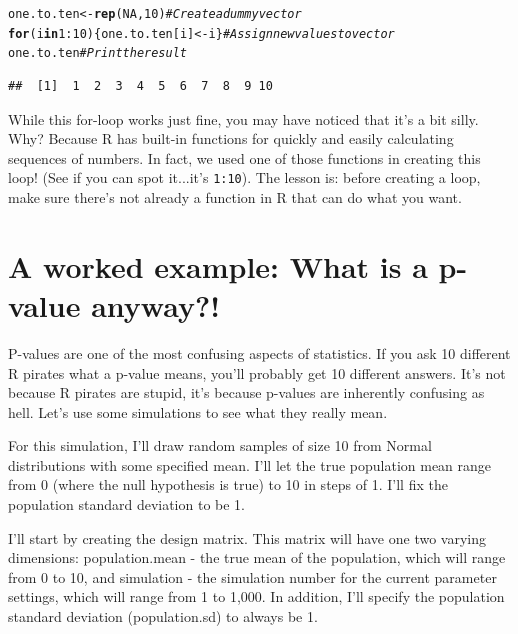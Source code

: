 \documentclass{tufte-book}\usepackage[]{graphicx}\usepackage[]{color}
\makeatletter
\newcommand{\hlnum}[1]{\textcolor[rgb]{0.686,0.059,0.569}{#1}}%
\newcommand{\hlcom}[1]{\textcolor[rgb]{0.678,0.584,0.686}{\textit{#1}}}%
\newcommand{\hlopt}[1]{\textcolor[rgb]{0,0,0}{#1}}%
\newcommand{\hlstd}[1]{\textcolor[rgb]{0.345,0.345,0.345}{#1}}%
\newcommand{\hlkwa}[1]{\textcolor[rgb]{0.161,0.373,0.58}{\textbf{#1}}}%
\newcommand{\hlkwb}[1]{\textcolor[rgb]{0.69,0.353,0.396}{#1}}%
\newcommand{\hlkwd}[1]{\textcolor[rgb]{0.737,0.353,0.396}{\textbf{#1}}}%
\newenvironment{kframe}{%
 \def\at@end@of@kframe{}%
 \ifinner\ifhmode%
  \def\at@end@of@kframe{\end{minipage}}%
  \begin{minipage}{\columnwidth}%
 \fi\fi%
 \def\FrameCommand##1{\hskip\@totalleftmargin \hskip-\fboxsep
 \colorbox{shadecolor}{##1}\hskip-\fboxsep
     \hskip-\linewidth \hskip-\@totalleftmargin \hskip\columnwidth}%
 \MakeFramed {\advance\hsize-\width
   \@totalleftmargin\z@ \linewidth\hsize
   \@setminipage}}%
 {\par\unskip\endMakeFramed%
 \at@end@of@kframe}
\newenvironment{knitrout}{}{} %
\makeatother
\begin{document}
\begin{footnotesize}
\begin{knitrout}
\color{fgcolor}\begin{kframe}
\begin{alltt}
\hlstd{one.to.ten} \hlkwb{<-} \hlkwd{rep}\hlstd{(}\hlnum{NA}\hlstd{,} \hlnum{10}\hlstd{)} \hlcom{# Create a dummy vector}
\hlkwa{for} \hlstd{(i} \hlkwa{in} \hlnum{1}\hlopt{:}\hlnum{10}\hlstd{) \{one.to.ten[i]} \hlkwb{<-} \hlstd{i\}} \hlcom{# Assign new values to vector}
\hlstd{one.to.ten} \hlcom{# Print the result}
\end{alltt}
\begin{verbatim}
##  [1]  1  2  3  4  5  6  7  8  9 10
\end{verbatim}
\end{kframe}
\end{knitrout}

While this for-loop works just fine, you may have noticed that it's a bit silly. Why? Because R has built-in functions for quickly and easily calculating sequences of numbers. In fact, we used one of those functions in creating this loop! (See if you can spot it...it's \texttt{1:10}). The lesson is: before creating a loop, make sure there's not already a function in R that can do what you want.


\section{A worked example: What is a p-value anyway?!}

P-values are one of the most confusing aspects of statistics. If you ask 10 different R pirates what a p-value means, you'll probably get 10 different answers. It's not because R pirates are stupid, it's because p-values are inherently confusing as hell. Let's use some simulations to see what they really mean. 

For this simulation, I'll draw random samples of size 10 from Normal distributions with some specified mean. I'll let the true population mean range from 0 (where the null hypothesis is true) to 10 in steps of 1. I'll fix the population standard deviation to be 1.

I'll start by creating the design matrix. This matrix will have one two varying dimensions: population.mean - the true mean of the population, which will range from 0 to 10, and simulation - the simulation number for the current parameter settings, which will range from 1 to 1,000. In addition, I'll specify the population standard deviation (population.sd) to always be 1. 


\end{footnotesize}
\end{document}
